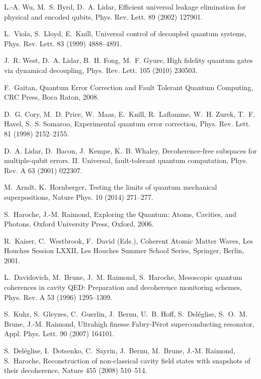 \documentclass[3p,sort&compress]{elsarticle}
\begin{document}
\begin{thebibliography}{100}
L.-A. Wu, M.~S. Byrd, D.~A. Lidar, Efficient universal leakage elimination for
  physical and encoded qubits, Phys. Rev. Lett. 89 (2002) 127901.

L.~Viola, S.~Lloyd, E.~Knill, Universal control of decoupled quantum systems,
  Phys. Rev. Lett. 83 (1999) 4888--4891.

J.~R. West, D.~A. Lidar, B.~H. Fong, M.~F. Gyure, High fidelity quantum gates
  via dynamical decoupling, Phys. Rev. Lett. 105 (2010) 230503.

F.~Gaitan, Quantum Error Correction and Fault Tolerant Quantum Computing, CRC
  Press, Boca Raton, 2008.

D.~G. Cory, M.~D. Price, W.~Maas, E.~Knill, R.~Laflamme, W.~H. Zurek, T.~F.
  Havel, S.~S. Somaroo, Experimental quantum error correction, Phys. Rev. Lett.
  81 (1998) 2152--2155.

D.~A. Lidar, D.~Bacon, J.~Kempe, K.~B. Whaley, Decoherence-free subspaces for
  multiple-qubit errors. {II.} {U}niversal, fault-tolerant quantum computation,
  Phys. Rev. A 63 (2001) 022307.

M.~Arndt, K.~Hornberger, Testing the limits of quantum mechanical
  superpositions, Nature Phys. 10 (2014) 271--277.

S.~Haroche, J.-M. Raimond, Exploring the Quantum: Atoms, Cavities, and Photons,
  Oxford University Press, Oxford, 2006.

R.~Kaiser, C.~Westbrook, F.~David (Eds.), Coherent Atomic Matter Waves, Les
  Houches Session LXXII, Les Houches Summer School Series, Springer, Berlin,
  2001.

L.~Davidovich, M.~Brune, J.~M. Raimond, S.~Haroche, Mesoscopic quantum
  coherences in cavity {QED}: Preparation and decoherence monitoring schemes,
  Phys. Rev. A 53 (1996) 1295--1309.

S.~Kuhr, S.~Gleyzes, C.~Guerlin, J.~Bernu, U.~B. Hoff, S.~Del{\'e}glise,
  S.~O.~M. Brune, J.-M. Raimond, Ultrahigh finesse {F}abry-{P}{\'e}rot
  superconducting resonator, Appl. Phys. Lett. 90 (2007) 164101.

S.~Del{\'e}glise, I.~Dotsenko, C.~Sayrin, J.~Bernu, M.~Brune, J.-M. Raimond,
  S.~Haroche, Reconstruction of non-classical cavity field states with
  snapshots of their decoherence, Nature 455 (2008) 510--514.


\end{thebibliography}
\end{document}
